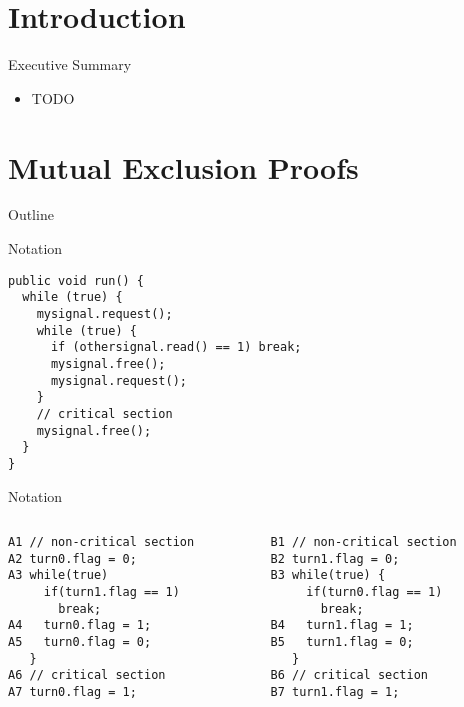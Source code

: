 \section*{Introduction}

\begin{frame}{Executive Summary}
  \begin{itemize}
  \item TODO
  \end{itemize}
\end{frame}


\section{Mutual Exclusion Proofs}

\begin{frame}{Outline}
  \tableofcontents[current]
\end{frame}

\begin{frame}[fragile]{Notation}
\begin{lstlisting}
public void run() {
  while (true) {
    mysignal.request();
    while (true) {
      if (othersignal.read() == 1) break;
      mysignal.free();
      mysignal.request();
    }
    // critical section
    mysignal.free();
  }
}
\end{lstlisting}
\end{frame}

\begin{frame}[fragile]{Notation}
  \begin{columns}[c]
    \begin{column}{0.50\textwidth}
\begin{lstlisting}[basicstyle=\fontsize{9}{11}\selectfont\ttfamily]
A1 // non-critical section
A2 turn0.flag = 0;
A3 while(true)
     if(turn1.flag == 1) 
       break;
A4   turn0.flag = 1;
A5   turn0.flag = 0;
   }
A6 // critical section
A7 turn0.flag = 1;
\end{lstlisting}
    \end{column}
    \begin{column}{0.50\textwidth}
\begin{lstlisting}[basicstyle=\fontsize{9}{11}\selectfont\ttfamily]
B1 // non-critical section
B2 turn1.flag = 0;
B3 while(true) {
     if(turn0.flag == 1) 
       break;
B4   turn1.flag = 1;
B5   turn1.flag = 0;
   }
B6 // critical section
B7 turn1.flag = 1;
\end{lstlisting}
    \end{column}
  \end{columns}
\end{frame}

